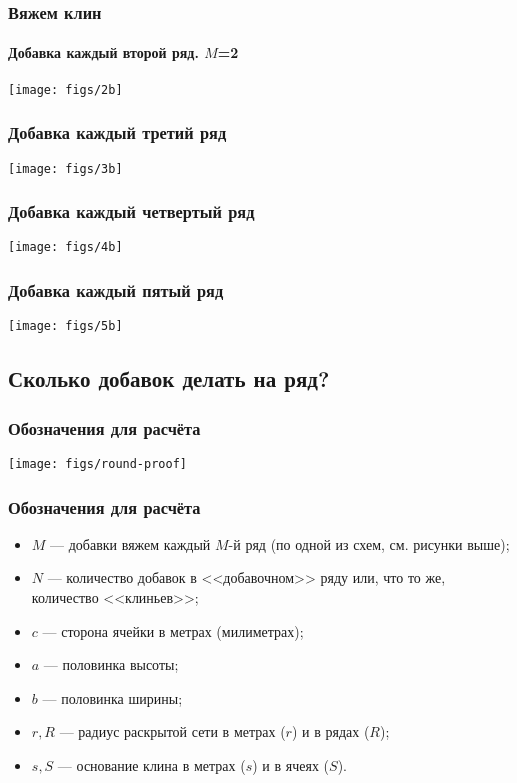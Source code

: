 \begin{frame}
    \frametitle{Вяжем клин}
    \framesubtitle{Добавка каждый второй ряд. $M$=2}

    \begin{center}
        \texttt{[image: figs/2b]}
    \end{center}
\end{frame}

\begin{frame}
    \frametitle{Добавка каждый \alert{третий} ряд}

    \begin{center}
        \texttt{[image: figs/3b]}
    \end{center}
\end{frame}

\begin{frame}
    \frametitle{Добавка каждый \alert{четвертый} ряд}

    \begin{center}
        \texttt{[image: figs/4b]}
    \end{center}
\end{frame}

\begin{frame}
    \frametitle{Добавка каждый \alert{пятый} ряд}

    \begin{center}
        \texttt{[image: figs/5b]}
    \end{center}
\end{frame}


\subsection{Сколько добавок делать на ряд?}

\begin{frame}
    \frametitle{Обозначения для расчёта}

    \begin{center}
        \texttt{[image: figs/round-proof]}
    \end{center}
\end{frame}

\begin{frame}
    \frametitle{Обозначения для расчёта}

	\begin{itemize}
		\item $M$ --- добавки вяжем каждый $M$-й ряд (по одной из схем, см. рисунки выше); 
		\item $N$ --- количество добавок в <<добавочном>> ряду или, что то же, количество <<клиньев>>; 
		\item $c$ --- сторона ячейки в метрах (милиметрах);
		\item $a$ --- половинка высоты; 
		\item $b$ --- половинка ширины; 
		\item $r,R$ --- радиус раскрытой сети в метрах ($r$) и в рядах ($R$); 
		\item $s,S$ --- основание клина в метрах ($s$) и в ячеях ($S$).
	\end{itemize}
\end{frame}

